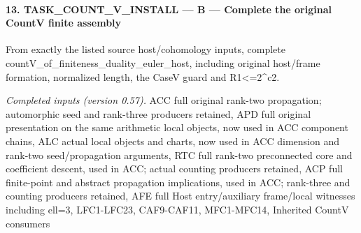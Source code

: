 \paragraph{13. TASK\_\allowbreak COUNT\_\allowbreak V\_\allowbreak INSTALL — B — Complete the original CountV finite assembly}

From exactly the listed source host/cohomology inputs, complete countV\_\allowbreak of\_\allowbreak finiteness\_\allowbreak duality\_\allowbreak euler\_\allowbreak host, including original host/frame formation, normalized length, the CaseV guard and R1<=2\textasciicircum{}c2.

\emph{Completed inputs (version 0.57).} ACC full original rank-two propagation; automorphic seed and rank-three producers retained, APD full original presentation on the same arithmetic local objects, now used in ACC component chains, ALC actual local objects and charts, now used in ACC dimension and rank-two seed/propagation arguments, RTC full rank-two preconnected core and coefficient descent, used in ACC; actual counting producers retained, ACP full finite-point and abstract propagation implications, used in ACC; rank-three and counting producers retained, AFE full Host entry/auxiliary frame/local witnesses including ell=3, LFC1-LFC23, CAF9-CAF11, MFC1-MFC14, Inherited CountV consumers

